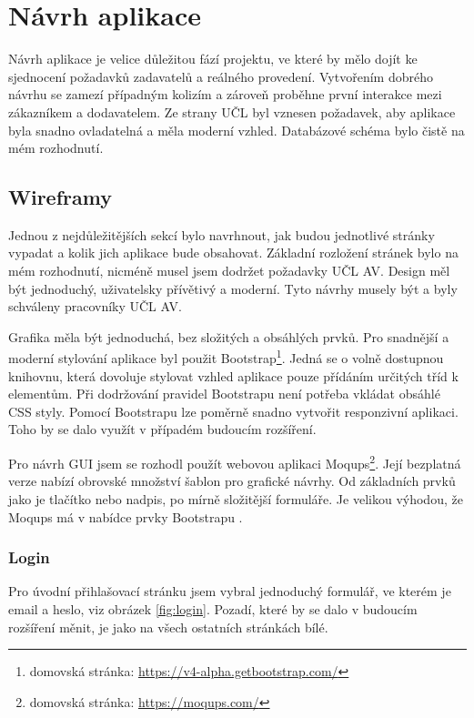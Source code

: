 \chapter{Návrh aplikace}
    Návrh aplikace je velice důležitou fází projektu, ve které by mělo dojít ke sjednocení požadavků zadavatelů a reálného provedení. Vytvořením dobrého návrhu se zamezí případným kolizím a zároveň proběhne první interakce mezi zákazníkem a dodavatelem. Ze strany UČL byl vznesen požadavek, aby aplikace byla snadno ovladatelná a měla moderní vzhled. Databázové schéma bylo čistě na mém rozhodnutí.
    
    \section{Wireframy}

        Jednou z nejdůležitějších sekcí bylo navrhnout, jak budou jednotlivé stránky vypadat a kolik jich aplikace bude obsahovat. Základní rozložení stránek bylo na mém rozhodnutí, nicméně musel jsem dodržet požadavky UČL AV. Design měl být jednoduchý, uživatelsky přívětivý a moderní. Tyto návrhy musely být a byly schváleny pracovníky UČL AV.
        
        Grafika měla být jednoduchá, bez složitých a obsáhlých prvků. Pro snadnější a moderní stylování aplikace byl použit Bootstrap\footnote{domovská stránka: \url{https://v4-alpha.getbootstrap.com/}}. Jedná se o volně dostupnou knihovnu, která dovoluje stylovat vzhled aplikace pouze přídáním určitých tříd k elementům. Při dodržování pravidel Bootstrapu není potřeba vkládat obsáhlé CSS styly. Pomocí Bootstrapu lze poměrně snadno vytvořit responzivní aplikaci. Toho by se dalo využít v případém budoucím rozšíření.
        
        Pro návrh GUI jsem se rozhodl použít webovou aplikaci Moqups\footnote{domovská stránka: \url{https://moqups.com/}}. Její bezplatná verze nabízí obrovské množství šablon pro grafické návrhy. Od základních prvků jako je tlačítko nebo nadpis, po mírně složitější formuláře. Je velikou výhodou, že Moqups má v nabídce prvky Bootstrapu . 
        
        \subsection{Login}
            Pro úvodní přihlašovací stránku jsem vybral jednoduchý formulář, ve kterém je email a heslo, viz obrázek \ref{fig:login}. Pozadí, které by se dalo v budoucím rozšíření měnit, je jako na všech ostatních stránkách bílé.
            
